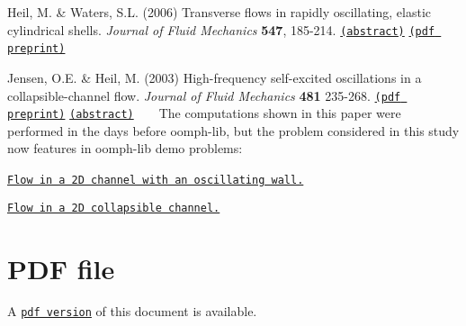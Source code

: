 \begin{DoxyItemize}
\item Heil, M. \& Waters, S.\+L. (2006) Transverse flows in rapidly oscillating, elastic cylindrical shells. {\itshape Journal of Fluid Mechanics} {\bfseries 547}, 185-\/214. \href{http://www.maths.man.ac.uk/~mheil/MATTHIAS/ABSTRACTS/HeilWaters2004.html}{\tt (abstract)} \href{http://www.maths.man.ac.uk/~mheil/MATTHIAS/PDF/OscRing_final_version_for_WWW.pdf}{\tt (pdf preprint)} ~\newline
~\newline

\item Jensen, O.\+E. \& Heil, M. (2003) High-\/frequency self-\/excited oscillations in a collapsible-\/channel flow. {\itshape Journal of Fluid Mechanics} {\bfseries 481} 235-\/268. \href{http://www.maths.man.ac.uk/~mheil/MATTHIAS/PDF/JensenHeil2003.pdf}{\tt (pdf preprint)} \href{http://www.maths.man.ac.uk/~mheil/MATTHIAS/ABSTRACTS/JensenHeil02.html}{\tt (abstract)} ~\newline
~\newline
 The computations shown in this paper were performed in the days before {\ttfamily oomph-\/lib}, but the problem considered in this study now features in oomph-\/lib demo problems\+: ~\newline
~\newline

\begin{DoxyItemize}
\item \href{../../navier_stokes/collapsible_channel/html/index.html}{\tt Flow in a 2D channel with an oscillating wall.} ~\newline
~\newline

\item \href{../../interaction/fsi_collapsible_channel/html/index.html}{\tt Flow in a 2D collapsible channel.}
\end{DoxyItemize}
\end{DoxyItemize}



 

 \hypertarget{index_pdf}{}\section{P\+D\+F file}\label{index_pdf}
A \href{../latex/refman.pdf}{\tt pdf version} of this document is available. 
